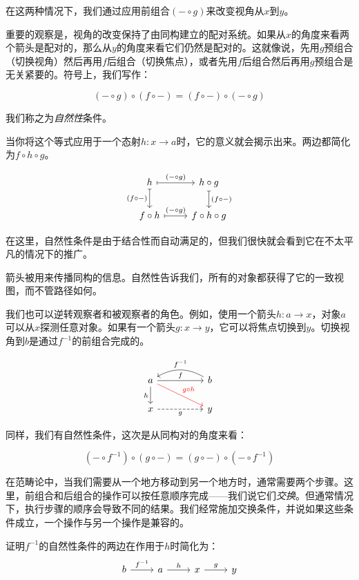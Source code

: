 \documentclass[DaoFP]{subfiles}
\begin{document}
 在这两种情况下，我们通过应用前组合$(- \circ g)$来改变视角从$x$到$y$。

 重要的观察是，视角的改变保持了由同构建立的配对系统。如果从$x$的角度来看两个箭头是配对的，那么从$y$的角度来看它们仍然是配对的。这就像说，先用$g$预组合（切换视角）然后再用$f$后组合（切换焦点），或者先用$f$后组合然后再用$g$预组合是无关紧要的。符号上，我们写作：

 \[(- \circ g) \circ (f \circ -) = (f \circ -) \circ (- \circ g)\]

 我们称之为\emph{自然性}条件。

 当你将这个等式应用于一个态射$h \colon x \to a$时，它的意义就会揭示出来。两边都简化为$f \circ h \circ g$。

 \[
  \begin{tikzcd}
   h
   \arrow[r, mapsto, "(- \circ g)"]
   \arrow[d, mapsto, "(f \circ -)"']
   & h \circ g
   \arrow[d, mapsto, "(f \circ -)"]
   \\
   f \circ h
   \arrow[r, mapsto, "(- \circ g)"]
   & f \circ h \circ g
  \end{tikzcd}
 \]

 在这里，自然性条件是由于结合性而自动满足的，但我们很快就会看到它在不太平凡的情况下的推广。

 箭头被用来传播同构的信息。自然性告诉我们，所有的对象都获得了它的一致视图，而不管路径如何。

 我们也可以逆转观察者和被观察者的角色。例如，使用一个箭头$h \colon a \to x$，对象$a$可以从$x$探测任意对象。如果有一个箭头$g \colon x \to y$，它可以将焦点切换到$y$。切换视角到$b$是通过$f^{-1}$的前组合完成的。

 \[
  \begin{tikzcd}
   a
   \arrow[rr, "f"]
   \arrow[d, "h"']
   \arrow[rrd, red, "g\circ h"]
   && b
   \arrow[ll, bend right,  "f^{-1}"']
   \\
   x
   \arrow[rr, dashed, "g"']
   && y
  \end{tikzcd}
 \]

 同样，我们有自然性条件，这次是从同构对的角度来看：

 \[(- \circ f^{-1}) \circ (g \circ -) = (g \circ -) \circ (- \circ f^{-1})\]

 在范畴论中，当我们需要从一个地方移动到另一个地方时，通常需要两个步骤。这里，前组合和后组合的操作可以按任意顺序完成——我们说它们\emph{交换}。但通常情况下，执行步骤的顺序会导致不同的结果。我们经常施加交换条件，并说如果这些条件成立，一个操作与另一个操作是兼容的。

 \begin{exercise}
  证明$f^{-1}$的自然性条件的两边在作用于$h$时简化为：
  \[
   \begin{tikzcd}
    b \arrow[r, "f^{-1}"] &a \arrow[r, "h"] & x \arrow[r, "g"] & y
   \end{tikzcd}
  \]
 \end{exercise}
\end{document}
